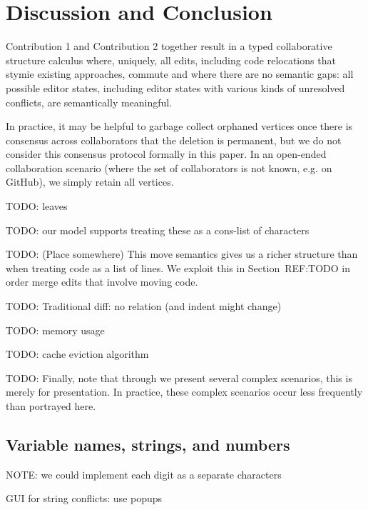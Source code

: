 
\section{Discussion and Conclusion}%
\label{sec:Discussion and Conclusion}

Contribution 1 and Contribution 2 together result in a typed collaborative structure calculus
where, uniquely, all edits, including code relocations that stymie existing approaches, commute and where there are no semantic gaps: all possible editor states, including editor states with various kinds of unresolved conflicts, are semantically meaningful.

In practice, it may be helpful to garbage collect orphaned vertices once there is consensus across collaborators that the deletion is permanent, but we do not consider this consensus protocol formally in this paper. In an open-ended collaboration scenario (where the set of collaborators is not known, e.g. on GitHub), we simply retain all vertices.


TODO: leaves

TODO: our model supports treating these as a cons-list of characters

TODO: (Place somewhere) This move semantics gives us a richer structure than
when treating code as a list of lines.  We exploit
this in Section~REF:TODO in order merge edits that involve moving code.

TODO: Traditional diff: no relation (and indent might change)

TODO: memory usage

TODO: cache eviction algorithm

TODO: Finally, note that through we present several complex scenarios, this is merely for presentation.
In practice, these complex scenarios occur less frequently than portrayed here.

\subsection{Variable names, strings, and numbers}%
\label{sub:Variable names, strings, and numbers}

NOTE: we could implement each digit as a separate characters

GUI for string conflicts: use popups
